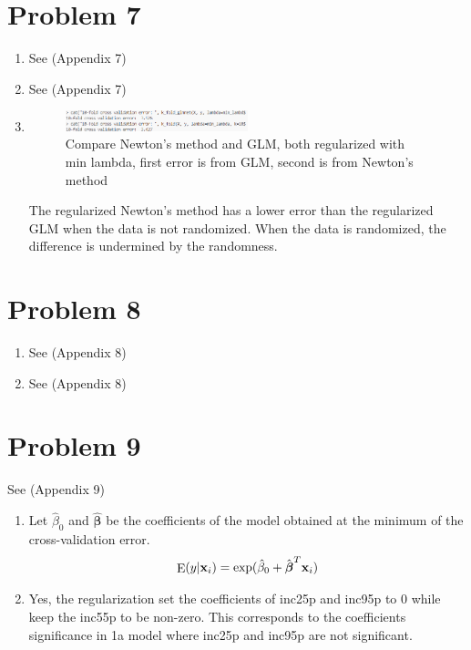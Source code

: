\documentclass{article}
\newcommand{\vect}[1]{\boldsymbol{#1}}
\newcommand{\vectrm}[1]{\boldsymbol{\rm #1}}
\DeclareMathOperator{\E}{E}
\begin{document}
\newpage
\section*{Problem 7}
\begin{enumerate}[label=(\alph*)]
  \item  See (Appendix 7)
  \item  See (Appendix 7)
  \item 

  \begin{figure}[h]
      \centering
      \includegraphics[width=0.5\textwidth]{7c.png}
      \caption{Compare Newton's method and GLM, both regularized with min lambda, first error is from GLM, second is from Newton's method}
  \end{figure}

  The regularized Newton's method has a lower error than the regularized GLM when the data is not randomized. When the data is randomized, the difference is undermined by the randomness.

\end{enumerate}

\newpage
\section*{Problem 8}
\begin{enumerate}[label=(\alph*)]
  \item  See (Appendix 8)
  \item  See (Appendix 8)
\end{enumerate}

\section*{Problem 9}
See (Appendix 9)
\begin{enumerate}[label=(\alph*)]
  \item 
  Let \(\hat{\beta}_0\) and \(\hat{\vect{\beta}}\) be the coefficients of the model obtained at the minimum of the cross-validation error.
  \[
  \E(y| \vectrm{x}_i) = \exp(\hat{\beta}_0 + \hat{\vect{\beta}}^T \vectrm{x}_i)
  \]
  \item  Yes, the regularization set the coefficients of inc25p and inc95p to 0 while keep the inc55p to be non-zero. This corresponds to the coefficients significance in 1a model where inc25p and inc95p are not significant.
\end{enumerate}
\end{document}

